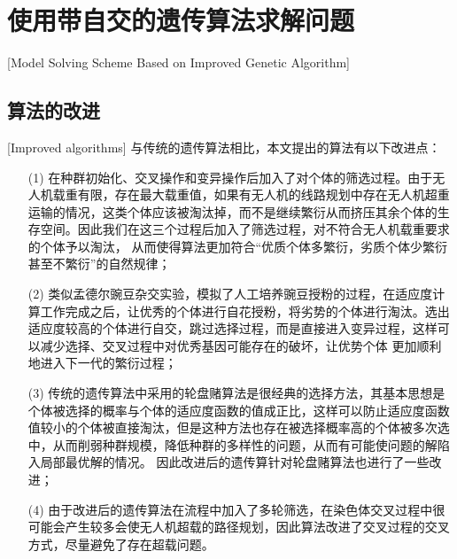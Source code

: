 
\chapter{使用带自交的遗传算法求解问题}[Model Solving Scheme Based on Improved Genetic Algorithm]
\section{算法的改进}[Improved algorithms]
与传统的遗传算法相比，本文提出的算法有以下改进点：
\begin{itemize}
	\item [(1)] 在种群初始化、交叉操作和变异操作后加入了对个体的筛选过程。由于无人机载重有限，存在最大载重值，如果有无人机的线路规划中存在无人机超重运输的情况，这类个体应该被淘汰掉，而不是继续繁衍从而挤压其余个体的生存空间。因此我们在这三个过程后加入了筛选过程，对不符合无人机载重要求的个体予以淘汰，
从而使得算法更加符合“优质个体多繁衍，劣质个体少繁衍甚至不繁衍”的自然规律；
	\item [(2)] 类似孟德尔豌豆杂交实验，模拟了人工培养豌豆授粉的过程，在适应度计算工作完成之后，让优秀的个体进行自花授粉，将劣势的个体进行淘汰。选出适应度较高的个体进行自交，跳过选择过程，而是直接进入变异过程，这样可以减少选择、交叉过程中对优秀基因可能存在的破坏，让优势个体
更加顺利地进入下一代的繁衍过程；
	\item [(3)] 传统的遗传算法中采用的轮盘赌算法是很经典的选择方法，其基本思想是个体被选择的概率与个体的适应度函数的值成正比，这样可以防止适应度函数值较小的个体被直接淘汰，但是这种方法也存在被选择概率高的个体被多次选中，从而削弱种群规模，降低种群的多样性的问题，从而有可能使问题的解陷入局部最优解的情况。
因此改进后的遗传算针对轮盘赌算法也进行了一些改进；
	\item [(4)] 由于改进后的遗传算法在流程中加入了多轮筛选，在染色体交叉过程中很可能会产生较多会使无人机超载的路径规划，因此算法改进了交叉过程的交叉方式，尽量避免了存在超载问题。
\end{itemize}


